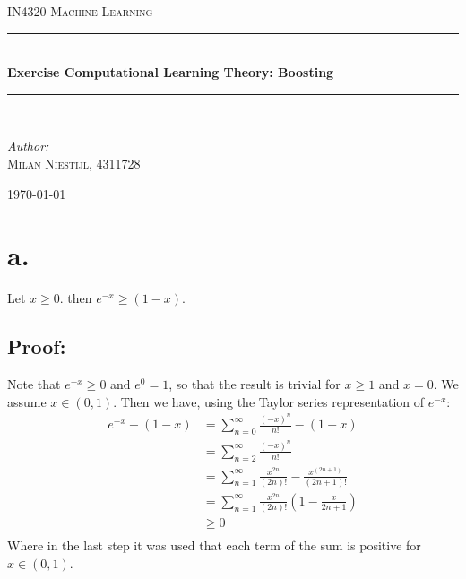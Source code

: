 \documentclass [a4paper] {report}
\begin{document}
	
	\begin{titlepage}
		\begin{center}
			
			\textsc{\LARGE IN4320 Machine Learning}\\[1.25cm]
			
			\rule{\linewidth}{0.5mm}\\[1.0cm]
			{\huge \bfseries Exercise Computational Learning Theory: Boosting }\\[0.6cm]
			\rule{\linewidth}{0.5mm}\\[1.5cm]
			
			\begin{minipage}{0.4\textwidth}
				\begin{flushleft} \large	
					\emph{Author:}\\
					\textsc{Milan Niestijl, 4311728}
				\end{flushleft}
			\end{minipage}
			
			\vfill
			{\large \today}
		\end{center}
	\end{titlepage}
	
	\section*{a.}
	Let $x\geq0$. then $e^{-x} \geq (1-x)$.\\
	\subsection*{Proof:}
	Note that $e^{-x} \geq 0$ and $e^{0} = 1$, so that the result is trivial for $x\geq 1$ and $x=0$. We assume $x \in (0,1)$. Then we have, using the Taylor series representation of $e^{-x}$:
	\begin{equation*}
		\begin{split}
			e^{-x} - (1-x) &=\sum_{n=0}^{\infty}\frac{(-x)^{n}}{n!} - (1-x)\\
			&= \sum_{n=2}^{\infty}\frac{(-x)^{n}}{n!}\\
			&= \sum_{n=1}^{\infty}\frac{x^{2n}}{(2n)!} - \frac{x^{(2n+1)}}{(2n+1)!}\\
			&= \sum_{n=1}^{\infty}\frac{x^{2n}}{(2n)!}\left( 1 - \frac{x}{2n + 1} \right)\\
			&\geq 0\\
		\end{split}
	\end{equation*}
	Where in the last step it was used that each term of the sum is positive for $x \in (0,1)$.
	
\end{document}
